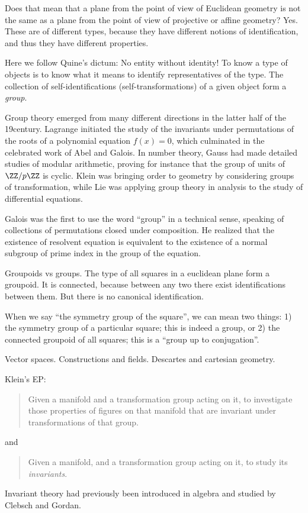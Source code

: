 Does that mean that a plane from the point of view of Euclidean
geometry is not the same as a plane from the point of view of
projective or affine geometry?
Yes.
These are of different types,
because they have different notions of identification,
and thus they have different properties.

Here we follow Quine's dictum: No entity without identity!
To know a type of objects is to know what it means to identify representatives of the type.
The collection of self-identifications (self-transformations) of a given object form a \emph{group}.


Group theory emerged from many different directions in the latter half of the 19\th century.
Lagrange initiated the study of the invariants under permutations
of the roots of a polynomial equation $f(x)=0$,
which culminated in the celebrated work of Abel and Galois.
In number theory, Gauss had made detailed studies of modular arithmetic,
proving for instance that the group of units of $\ZZ/p\ZZ$ is cyclic.
Klein was bringing order to geometry by considering groups of transformation,
while Lie was applying group theory in analysis to the study of differential equations.

Galois was the first to use the word ``group'' in a technical sense,
speaking of collections of permutations closed under composition.
He realized that the existence of resolvent equation is equivalent
to the existence of a normal subgroup of prime index
in the group of the equation.

Groupoids vs groups.
The type of all squares in a euclidean plane form a groupoid.
It is connected,
because between any two there exist identifications between them.
But there is no canonical identification.

When we say ``the symmetry group of the square'',
we can mean two things:
1) the symmetry group of a particular square;
this is indeed a group,
or 2) the connected groupoid of all squares;
this is a ``group up to conjugation''.

Vector spaces. Constructions and fields. Descartes and cartesian geometry.

Klein's EP:
\begin{quote}
  Given a manifold and a transformation group acting on it,
  to investigate those properties of figures on that manifold
  that are invariant under transformations of that group.
\end{quote}
and
\begin{quote}
  Given a manifold, and a transformation group acting on it,
  to study its \emph{invariants}.
\end{quote}
Invariant theory had previously been introduced in algebra
and studied by Clebsch and Gordan.


